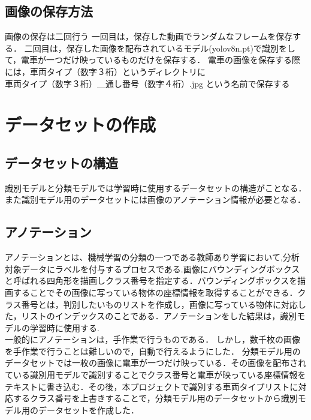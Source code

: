 \subsection{画像の保存方法}
画像の保存は二回行う
一回目は，保存した動画でランダムなフレームを保存する．
二回目は，保存した画像を配布されているモデル(yolov8n.pt)で識別をして，電車が一つだけ映っているものだけを保存する．
電車の画像を保存する際には，車両タイプ（数字３桁）というディレクトリに\\
車両タイプ（数字３桁）＿通し番号（数字４桁）.jpg    という名前で保存する
\section{データセットの作成}
\subsection{データセットの構造}
識別モデルと分類モデルでは学習時に使用するデータセットの構造がことなる．また識別モデル用のデータセットには画像のアノテーション情報が必要となる．
\subsection{アノテーション}
アノテーションとは、機械学習の分類の一つである教師あり学習において,分析対象データにラベルを付与するプロセスである.画像にバウンディングボックスと呼ばれる四角形を描画しクラス番号を指定する．バウンディングボックスを描画することでその画像に写っている物体の座標情報を取得することができる．クラス番号とは，判別したいものリストを作成し，画像に写っている物体に対応した，リストのインデックスのことである．アノテーションをした結果は，識別モデルの学習時に使用する.\\
一般的にアノテーションは，手作業で行うものである．
しかし，数千枚の画像を手作業で行うことは難しいので，自動で行えるようにした．
分類モデル用のデータセットでは一枚の画像に電車が一つだけ映っている．その画像を配布されている識別用モデルで識別することでクラス番号と電車が映っている座標情報をテキストに書き込む．その後，本プロジェクトで識別する車両タイプリストに対応するクラス番号を上書きすることで，分類モデル用のデータセットから識別モデル用のデータセットを作成した．


